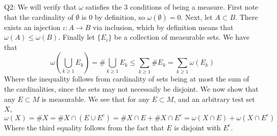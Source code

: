 \documentclass[letterpaper]{article}
\begin{document}
\noindent Q2: We will verify that $\omega$ satisfies the 3 conditions of being a measure. First note that the cardinality of $\emptyset$ is 0 by definition, so $\omega(\emptyset)=0$. Next, let $A\subset B$. There exists an injection $\iota:A\to B$ via inclusion, which by definition means that $\omega(A)\leq \omega(B)$. Finally let $\{E_i\}$ be a collection of measurable sets. We have that $$\omega(\bigcup_{k\geq 1} E_k) = \# \bigcup_{k\geq 1} E_k \leq \sum_{k\geq 1} \# E_k = \sum_{k\geq 1} \omega(E_k)$$
Where the inequality follows from cardinality of sets being at most the sum of the cardinalities, since the sets may not necessaily be disjoint. We now show that any $E\subset M$ is measurable. We see that for any $E\subset M$, and an arbitrary test set $X$,
$$\omega(X) = \#X = \#X \cap(E\cup E^c) = \# X\cap E + \# X\cap E^c = \omega(X\cap E) + \omega(X\cap E^c)$$
Where the third equality follows from the fact that $E$ is disjoint with $E^c$.  
\end{document}
